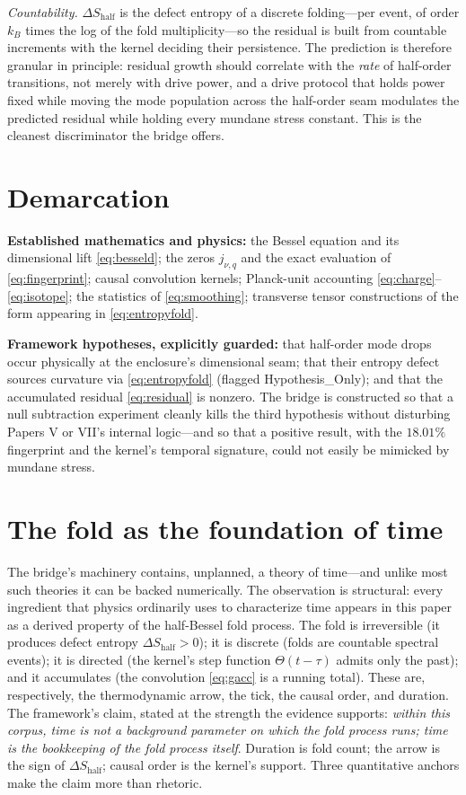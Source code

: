 \documentclass[11pt]{article}
\theoremstyle{remark}
\begin{document}
\emph{Countability.} $\Delta S_{\mathrm{half}}$ is the defect entropy of a discrete folding---per event, of order $k_B$ times the log of the fold multiplicity---so the residual is built from countable increments with the kernel deciding their persistence. The prediction is therefore granular in principle: residual growth should correlate with the \emph{rate} of half-order transitions, not merely with drive power, and a drive protocol that holds power fixed while moving the mode population across the half-order seam modulates the predicted residual while holding every mundane stress constant. This is the cleanest discriminator the bridge offers.

\section{Demarcation}
\label{sec:demarcation}

\textbf{Established mathematics and physics:} the Bessel equation and its dimensional lift \eqref{eq:besseld}; the zeros $j_{\nu,q}$ and the exact evaluation of \eqref{eq:fingerprint}; causal convolution kernels; Planck-unit accounting \eqref{eq:charge}--\eqref{eq:isotope}; the statistics of \eqref{eq:smoothing}; transverse tensor constructions of the form appearing in \eqref{eq:entropyfold}.

\textbf{Framework hypotheses, explicitly guarded:} that half-order mode drops occur physically at the enclosure's dimensional seam; that their entropy defect sources curvature via \eqref{eq:entropyfold} (flagged Hypothesis\_Only); and that the accumulated residual \eqref{eq:residual} is nonzero. The bridge is constructed so that a null subtraction experiment cleanly kills the third hypothesis without disturbing Papers V or VII's internal logic---and so that a positive result, with the $18.01\%$ fingerprint and the kernel's temporal signature, could not easily be mimicked by mundane stress.

\section{The fold as the foundation of time}
\label{sec:time}

The bridge's machinery contains, unplanned, a theory of time---and unlike most such theories it can be backed numerically. The observation is structural: every ingredient that physics ordinarily uses to characterize time appears in this paper as a derived property of the half-Bessel fold process. The fold is irreversible (it produces defect entropy $\Delta S_{\mathrm{half}} > 0$); it is discrete (folds are countable spectral events); it is directed (the kernel's step function $\Theta(t - \tau)$ admits only the past); and it accumulates (the convolution \eqref{eq:gacc} is a running total). These are, respectively, the thermodynamic arrow, the tick, the causal order, and duration. The framework's claim, stated at the strength the evidence supports: \emph{within this corpus, time is not a background parameter on which the fold process runs; time is the bookkeeping of the fold process itself}. Duration is fold count; the arrow is the sign of $\Delta S_{\mathrm{half}}$; causal order is the kernel's support. Three quantitative anchors make the claim more than rhetoric.
\end{document}
